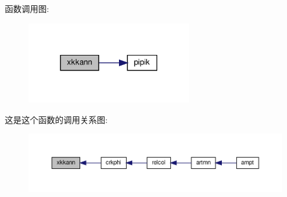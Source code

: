 函数调用图\+:
\nopagebreak
\begin{figure}[H]
\begin{center}
\leavevmode
\includegraphics[width=201pt]{xkkann_8f90_add7896ff3a582cd88509587f30c835ca_cgraph}
\end{center}
\end{figure}
这是这个函数的调用关系图\+:
\nopagebreak
\begin{figure}[H]
\begin{center}
\leavevmode
\includegraphics[width=350pt]{xkkann_8f90_add7896ff3a582cd88509587f30c835ca_icgraph}
\end{center}
\end{figure}
